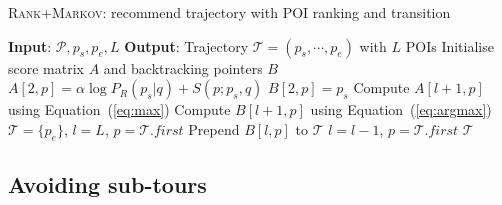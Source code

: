 \begin{algorithm}[t]
\caption{\textsc{Rank+Markov}: recommend trajectory with POI ranking and transition}
\label{alg:rank+markov}
\begin{algorithmic}[1]
\STATE \textbf{Input}: $\mathcal{P}, p_s, p_e, L$
\STATE \textbf{Output}: Trajectory $\mathcal{T} = (p_s, \cdots, p_e)$ with $L$ POIs
\STATE Initialise score matrix $A$ and backtracking pointers $B$
    \STATE $A[2, p] = \alpha \log P_R(p_s|q) + S(p; p_s, q)$
    \STATE $B[2, p] = p_s$
\ENDFOR
{}
        \STATE Compute $A[l+1, p]$ using Equation~(\ref{eq:max})
        \STATE Compute $B[l+1, p]$ using Equation~(\ref{eq:argmax})
    \ENDFOR
\ENDFOR
\STATE $\mathcal{T}= \{p_e\}$, $l = L$, $p = \mathcal{T}.first$
\REPEAT
    \STATE Prepend $B[l, p]$ to $\mathcal{T}$
    \STATE $l = l - 1$, $p = \mathcal{T}.first$
\RETURN $\mathcal{T}$
\end{algorithmic}
\end{algorithm}






\subsection{Avoiding sub-tours} %
\label{sec:nosubtour}


